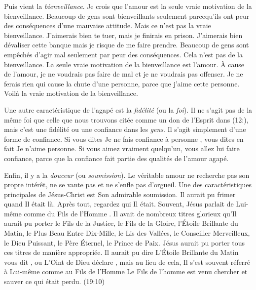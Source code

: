 Puis vient la \emph{bienveillance}. Je crois que l'amour est la seule
 vraie motivation de la bienveillance.
 Beaucoup de gens sont bienveillants seulement parcequ'ils ont peur
 des conséquences d'une mauvaise attitude.
 Mais ce n'est pas la vraie bienveillance.
 \Og J'aimerais bien te tuer, mais je finirais en prison.
 \ocadr J'aimerais bien dévaliser cette banque mais je risque
 de me faire prendre. \Fg{}
 Beaucoup de gens sont empêchés d'agir mal seulement par peur
 des conséquences. Cela n'est pas de la bienveillance.
 La seule vraie motivation de la bienveillance est l'amour.
 À cause de l'amour, je ne voudrais pas faire de mal
 et je ne voudrais pas offenser. Je ne ferais rien qui cause
 la chute d'une personne, parce que j'aime cette personne.
 Voilà la vraie motivation de la bienveillance.

Une autre caractéristique de l'agapé est la \emph{fidélité}
 (ou la \emph{foi}).
 Il ne s'agit pas de la même foi que celle que nous trouvons citée
 comme un don de l'Esprit dans (12:),
 mais c'est une fidélité ou une confiance dans les \emph{gens}.
 Il s'agit simplement d'une forme de confiance. Si vous dites\frcolon{}
 \Og Je ne fais confiance à personne \Fg{}, vous dites en fait\frcolon{}
 \Og Je n'aime personne. \Fg{}
 Si vous aimez vraiment quelqu'un, vous allez lui faire confiance,
 parce que la confiance fait partie des qualités de l'amour agapé.

Enfin, il y a la \emph{douceur} (ou \emph{soumission}).
 Le véritable amour ne recherche pas son propre intérêt,
 ne se vante pas et ne s'enfle pas d'orgueil.
 Une des caractéristiques principales de Jésus-Christ
 est Son admirable soumission. Il aurait pu frimer quand Il était là.
 Après tout, regardez qui Il était. Souvent, Jésus parlait de Lui-même
 comme du \Og Fils de l'Homme \Fg{}.
 Il avait de nombreux titres glorieux qu'Il aurait pu porter\frcolon{}
 le Fils de la Justice, le Fils de la Gloire, l'Étoile Brillante du Matin,
 le Plus Beau Entre Dix-Mille, le Lis des Vallées,
 le Conseiller Merveilleux, le Dieu Puissant, le Père Éternel,
 le Prince de Paix. Jésus aurait pu porter tous ces titres
 de manière appropriée. Il aurait pu dire\frcolon{}
 \Og L'Étoile Brillante du Matin vous dit \Fg{}, ou\frcolon{}
 \Og L'Oint de Dieu déclare \Fg{}, mais au lieu de cela,
 Il s'est souvent réferré à Lui-même comme au Fils de l'Homme\frcolon{}
 \Og Le Fils de l'homme est venu chercher et sauver
 ce qui était perdu. \Fg{} (19:10)

